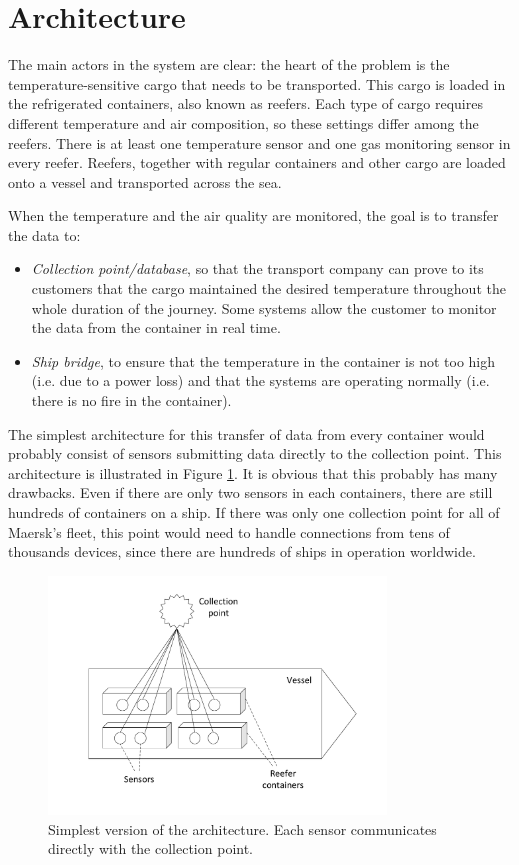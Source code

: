 \section{Architecture}

The main actors in the system are clear: the heart of the problem is the temperature-sensitive cargo that needs to be transported. This cargo is loaded in the refrigerated containers, also known as reefers. Each type of cargo requires different temperature and air composition, so these settings differ among the reefers. There is at least one temperature sensor and one gas monitoring sensor in every reefer. Reefers, together with regular containers and other cargo are loaded onto a vessel and transported across the sea.

When the temperature and the air quality are monitored, the goal is to transfer the data to:
\begin{itemize}
    \item \textit{Collection point/database}, so that the transport company can prove to its customers that the cargo maintained the desired temperature throughout the whole duration of the journey. Some systems allow the customer to monitor the data from the container in real time.
    \item \textit{Ship bridge}, to ensure that the temperature in the container is not too high (i.e. due to a power loss) and that the systems are operating normally (i.e. there is no fire in the container). 
\end{itemize}

The simplest architecture for this transfer of data from every container would probably consist of sensors submitting data directly to the collection point. This architecture is illustrated in Figure \ref{fig:arch-ver1}. It is obvious that this probably has many drawbacks. Even if there are only two sensors in each containers, there are still hundreds of containers on a ship. If there was only one collection point for all of Maersk’s fleet, this point would need to handle connections from tens of thousands devices, since there are hundreds of ships in operation worldwide.

\begin{figure}[ht]
    \centering
    \includegraphics[width=0.8\textwidth]{00images/arch-ver1}
    \caption{Simplest version of the architecture. Each sensor communicates directly with the collection point.}
    \label{fig:arch-ver1}
\end{figure}

